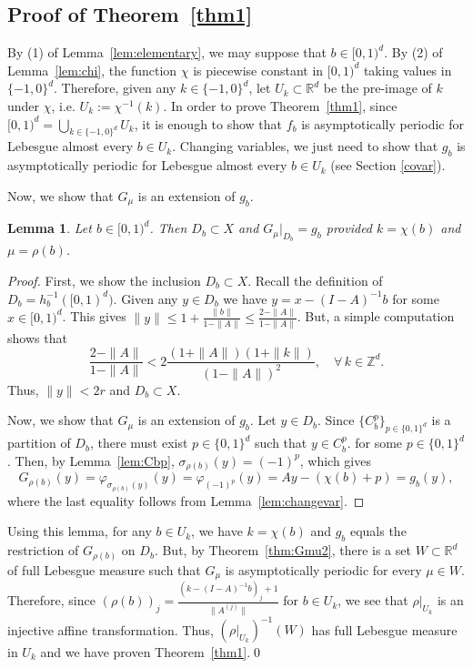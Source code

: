 \documentclass[12pt,reqno,a4paper]{amsart}%
\newtheorem{lemma}{Lemma}
\theoremstyle{definition}
\theoremstyle{remark}
\newcommand{\Rr}{\mathbb{R}}
\newcommand{\Zz}{\mathbb{Z}}
\begin{document}
{\subsection{Proof of Theorem~\ref{thm1}}

By (1) of Lemma~\ref{lem:elementary}, we may suppose that $b\in[0,1)^d$. 
By (2) of Lemma~\ref{lem:chi}, the function $\chi$ is piecewise constant in $[0,1)^d$ taking values in $\{-1,0\}^d$. Therefore, given any $k\in\{-1,0\}^d$, let $U_k\subset \Rr^d$ be the pre-image of $k$ under $\chi$, i.e. $U_k:= \chi^{-1}(k)$. In order to prove Theorem~\ref{thm1}, since $[0,1)^d=\bigcup_{k\in\{-1,0\}^d} U_k$, it is enough to show that $f_b$ is asymptotically periodic for Lebesgue almost every $b\in U_k$. Changing variables, we just need to show that  $g_b$ is asymptotically periodic for Lebesgue almost every $b\in U_k$ (see {Section \ref{covar}}). 



Now, we show that $G_\mu$ is an extension of $g_b$.
\begin{lemma}\label{lem:extension}
Let $b\in[0,1)^d$. Then $D_b\subset X$ and $G_\mu|_{D_b} = g_b$ provided $k=\chi(b)$ and $\mu=\rho(b)$.
\end{lemma}

\begin{proof}
First, we show the inclusion $D_b\subset X$. Recall the definition of $D_b= h_b^{-1}([0,1)^d)$. Given any $y\in D_b$ we have $y= x- (I-A)^{-1}b$ for some $x\in[0,1)^d$. This gives $\|y\|\leq 1+\frac{\|b\|}{1-\|A\|}\leq \frac{2-\|A\|}{1-\|A\|}$. But, a simple computation shows that 
$$
\frac{2-\|A\|}{1-\|A\|}< 2\frac{(1+\|A\|)(1+\|k\|)}{(1-\|A\|)^2},\quad \forall\, k\in \Zz^d.
$$
Thus, $\|y\|<2r$ and $D_b\subset X$. 

Now, we show that $G_\mu$ is an extension of $g_b$. Let $y\in D_b$. Since $\{C_b^p\}_{p\in\{0,1\}^d}$ is a partition of $D_b$, there must exist $p\in\{0,1\}^d$ such that $y\in C_b^p$. for some $p\in\{0,1\}^d$. Then, by Lemma~\ref{lem:Cbp}, $\sigma_{\rho(b)}(y)=(-1)^p$, which gives 
$$
G_{\rho(b)}(y)=\varphi_{\sigma_{\rho(b)}(y)}(y)= \varphi_{(-1)^p}(y) = Ay-(\chi(b) + p)= g_b(y),
$$
where the last equality follows from Lemma~\ref{lem:changevar}.
\end{proof}

Using this lemma, for any $b\in U_k$, we have $k=\chi(b)$ and $g_b$ equals the restriction of $G_{\rho(b)}$ on $D_b$. But, by Theorem~\ref{thm:Gmu2}, there is a set $W\subset \Rr^d$ of full Lebesgue measure such that $G_\mu$ is asymptotically periodic for every $\mu\in W$. Therefore, since $(\rho(b))_{{j}}=\frac{(k-(I-A)^{-1}b)_{{j}} + 1}{\|A^{{(j)}}\|}$ for $b\in U_k$, we see that $\rho|_{U_k}$ is an injective affine transformation. Thus, $(\rho|_{U_k})^{-1}(W)$ has full Lebesgue measure in $U_k$ and we have proven Theorem~\ref{thm1}.\qed

}
\end{document}
